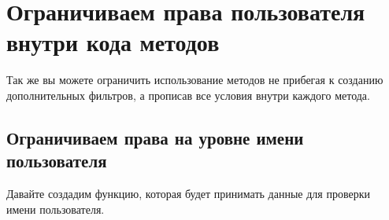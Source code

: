 \documentclass[
]{book}
\newenvironment{Shaded}{\begin{snugshade}}{\end{snugshade}}
\newcommand{\CommentTok}[1]{\textcolor[rgb]{0.56,0.35,0.01}{\textit{#1}}}
\newcommand{\FunctionTok}[1]{\textcolor[rgb]{0.00,0.00,0.00}{#1}}
\newcommand{\NormalTok}[1]{#1}
\newcommand{\OtherTok}[1]{\textcolor[rgb]{0.56,0.35,0.01}{#1}}
\newcommand{\SpecialCharTok}[1]{\textcolor[rgb]{0.00,0.00,0.00}{#1}}
\begin{document}
\begin{Shaded}
\end{Shaded}

\hypertarget{ux43eux433ux440ux430ux43dux438ux447ux438ux432ux430ux435ux43c-ux43fux440ux430ux432ux430-ux43fux43eux43bux44cux437ux43eux432ux430ux442ux435ux43bux44f-ux432ux43dux443ux442ux440ux438-ux43aux43eux434ux430-ux43cux435ux442ux43eux434ux43eux432}{%
\section{Ограничиваем права пользователя внутри кода методов}\label{ux43eux433ux440ux430ux43dux438ux447ux438ux432ux430ux435ux43c-ux43fux440ux430ux432ux430-ux43fux43eux43bux44cux437ux43eux432ux430ux442ux435ux43bux44f-ux432ux43dux443ux442ux440ux438-ux43aux43eux434ux430-ux43cux435ux442ux43eux434ux43eux432}}

Так же вы можете ограничить использование методов не прибегая к созданию дополнительных фильтров, а прописав все условия внутри каждого метода.

\hypertarget{ux43eux433ux440ux430ux43dux438ux447ux438ux432ux430ux435ux43c-ux43fux440ux430ux432ux430-ux43dux430-ux443ux440ux43eux432ux43dux435-ux438ux43cux435ux43dux438-ux43fux43eux43bux44cux437ux43eux432ux430ux442ux435ux43bux44f-1}{%
\subsection{Ограничиваем права на уровне имени пользователя}\label{ux43eux433ux440ux430ux43dux438ux447ux438ux432ux430ux435ux43c-ux43fux440ux430ux432ux430-ux43dux430-ux443ux440ux43eux432ux43dux435-ux438ux43cux435ux43dux438-ux43fux43eux43bux44cux437ux43eux432ux430ux442ux435ux43bux44f-1}}

Давайте создадим функцию, которая будет принимать данные для проверки имени пользователя.
\end{document}
